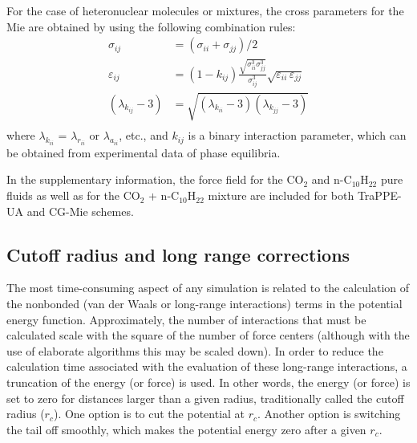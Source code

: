 \documentclass[9pt,tutorial]{livecoms}
\begin{document}
\begin{mdframed}[linewidth=0pt,backgroundcolor=LiveCoMSLightBlue!8,fontcolor=LiveCoMSDarkBlue!80!black]
For the case of heteronuclear molecules or mixtures, the cross parameters for the Mie are obtained by using the following combination rules:
\begin{align}
  \sigma_{ij} &= \left(\sigma_{ii}+\sigma_{jj}\right)/2 \\
  \varepsilon_{ij} &= \left(1-k_{ij}\right)\frac{\sqrt{\sigma_{ii}^{3}\sigma_{jj}^{3}}}{\sigma_{ij}^{3}}\sqrt{\varepsilon_{ii}\,\varepsilon_{jj}} \\
  \left(\lambda_{k_{ij}}-3\right) &= \sqrt{\left(\lambda_{k_{ii}}-3\right)\left(\lambda_{k_{jj}}-3\right)} \\
\end{align}
where $\lambda_{k_{ii}}$ = $\lambda_{r_{ii}}$ or $\lambda_{a_{ii}}$, etc., and $k_{ij}$ is a binary
interaction parameter, which can be obtained from experimental data of phase
equilibria.

In the supplementary information, the force field for the CO$_{2}$ and
n-C$_{10}$H$_{22}$ pure fluids as well as for the CO$_{2}$ + n-C$_{10}$H$_{22}$
mixture are included for both TraPPE-UA and CG-Mie schemes.
\end{mdframed}

\subsection{Cutoff radius and long range corrections} 
\label{sec:cutoff}
The most time-consuming aspect of any simulation is related to the calculation of the nonbonded (van
der Waals or long-range interactions) terms in the potential energy function.
Approximately, the number of interactions that must be calculated scale with
the square of the number of force centers (although with the use of elaborate
algorithms this may be scaled down). In order to reduce the calculation time
associated with the evaluation of these long-range interactions, a truncation
of the energy (or force) is used. In other words, the energy (or force) is set
to zero for distances larger than a given radius, traditionally called the
cutoff radius ($r_c$). One option is to cut the potential at $r_c$. Another 
option is switching the tail off smoothly, which makes the potential energy zero after
a given $r_c$. 
\end{document}
